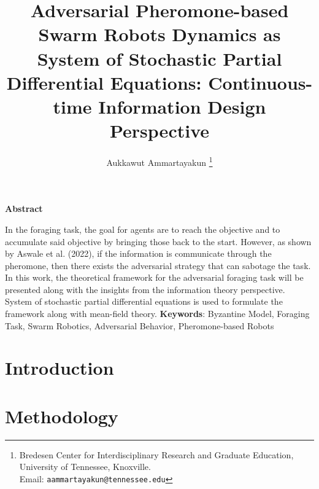 \documentclass[12pt]{article}
\begin{document}
\title{Adversarial Pheromone-based Swarm Robots Dynamics as System of Stochastic Partial Differential Equations: Continuous-time Information Design Perspective}  

\author{
Aukkawut Ammartayakun   \thanks{Bredesen Center for Interdisciplinary Research and Graduate Education, University of Tennessee, Knoxville.  \\Email: {\tt aammartayakun@tennessee.edu}}  
}

\maketitle

\begin{center}
\textbf{Abstract}
\end{center}

In the foraging task, the goal for agents are to reach the objective and to accumulate said objective by bringing those back to the start. However, as shown by Aswale et al. (2022), if the information is communicate through the pheromone, then there exists the adversarial strategy that can sabotage the task. In this work, the theoretical framework for the adversarial foraging task will be presented along with the insights from the information theory perspective. System of stochastic partial differential equations is used to formulate the framework along with mean-field theory. 
\noindent
\textbf{Keywords}: Byzantine Model, Foraging Task, Swarm Robotics, Adversarial Behavior, Pheromone-based Robots

\thispagestyle{empty}

\newpage


\section{Introduction}\label{intro}


\section{Methodology}
\end{document}
